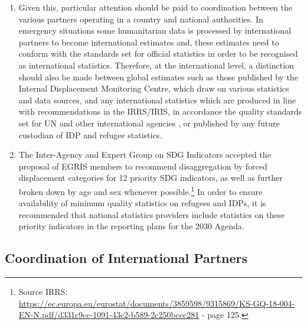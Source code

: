\documentclass[
]{article}
\begin{document}
\begin{enumerate}
\item
  Given this, particular attention should be paid to coordination
  between the various partners operating in a country and national
  authorities. In emergency situations some humanitarian data is
  processed by international partners to become international
  estimates and, these estimates need to conform with the standards
  set for official statistics in order to be recognised as
  international statistics. Therefore, at the international level, a
  distinction should also be made between global estimates such as
  those published by the Internal Displacement Monitoring Centre,
  which draw on various statistics and data sources, and any
  international statistics which are produced in line with
  recommendations in the IRRS/IRIS, in accordance the quality
  standards set for UN and other international agencies , or published
  by any future custodian of IDP and refugee statistics.
\item
  The Inter-Agency and Expert Group on SDG Indicators accepted the
  proposal of EGRIS members to recommend disaggregation by forced
  displacement categories for 12 priority SDG indicators, as well as
  further broken down by age and sex whenever possible.\footnote{Source IRRS:
    \url{https://ec.europa.eu/eurostat/documents/3859598/9315869/KS-GQ-18-004-EN-N.pdf/d331c9cc-1091-43c2-b589-2c250bccc281}
    - page 125.} In order
  to ensure availability of minimum quality statistics on refugees and
  IDPs, it is recommended that national statistics providers include
  statistics on these priority indicators in the reporting plans for
  the 2030 Agenda.
\end{enumerate}

\hypertarget{coordination-of-international-partners-1}{%
\subsection{Coordination of International Partners}\label{coordination-of-international-partners-1}}
\end{document}
